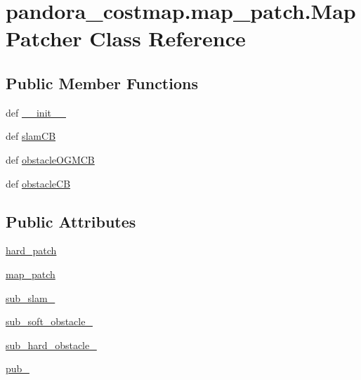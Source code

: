 \hypertarget{classpandora__costmap_1_1map__patch_1_1_map_patcher}{\section{pandora\-\_\-costmap.\-map\-\_\-patch.\-Map\-Patcher \-Class \-Reference}
\label{classpandora__costmap_1_1map__patch_1_1_map_patcher}
}
\subsection*{\-Public \-Member \-Functions}
\begin{DoxyCompactItemize}
\item 
def \hyperlink{classpandora__costmap_1_1map__patch_1_1_map_patcher_ae234912f7f410b4dff944e7e30c013de}{\-\_\-\-\_\-init\-\_\-\-\_\-}
\item 
def \hyperlink{classpandora__costmap_1_1map__patch_1_1_map_patcher_a116d0951402597fe9b5647864cbb918e}{slam\-C\-B}
\item 
def \hyperlink{classpandora__costmap_1_1map__patch_1_1_map_patcher_ab0da8c06f05090a21aee2dbf7cb73a62}{obstacle\-O\-G\-M\-C\-B}
\item 
def \hyperlink{classpandora__costmap_1_1map__patch_1_1_map_patcher_a47486a02694b35c9e3da9db54fbda5f6}{obstacle\-C\-B}
\end{DoxyCompactItemize}
\subsection*{\-Public \-Attributes}
\begin{DoxyCompactItemize}
\item 
\hyperlink{classpandora__costmap_1_1map__patch_1_1_map_patcher_a1eb3d936effd20a12fbe8eb0d2f5fb4b}{hard\-\_\-patch}
\item 
\hyperlink{classpandora__costmap_1_1map__patch_1_1_map_patcher_ad11a08f56576ed8e06ec15f2c1002724}{map\-\_\-patch}
\item 
\hyperlink{classpandora__costmap_1_1map__patch_1_1_map_patcher_a2da6d99ce5cd8946a2c8884520843016}{sub\-\_\-slam\-\_\-}
\item 
\hyperlink{classpandora__costmap_1_1map__patch_1_1_map_patcher_ae76c0bf268bfc110968aeb3af41157af}{sub\-\_\-soft\-\_\-obstacle\-\_\-}
\item 
\hyperlink{classpandora__costmap_1_1map__patch_1_1_map_patcher_a9353043add258a01a6499763bfef7b7a}{sub\-\_\-hard\-\_\-obstacle\-\_\-}
\item 
\hyperlink{classpandora__costmap_1_1map__patch_1_1_map_patcher_a922ce73d608295f1ad0c77ea7fa839d5}{pub\-\_\-}
\end{DoxyCompactItemize}


